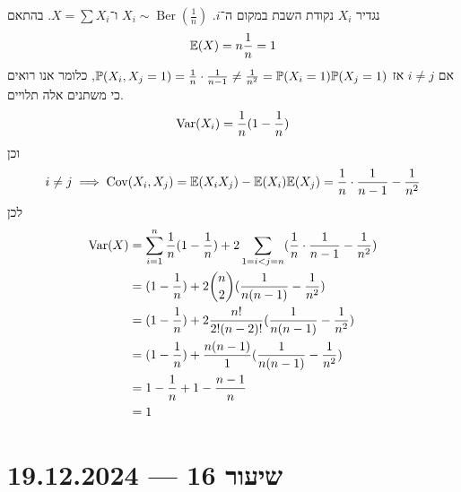 \begin{solution}
	נגדיר $X_i$ נקודת השבת במקום ה־$i$.
	$X_i \sim \operatorname{Ber}(\frac{1}{n})$ ו־$X = \sum X_i$.
	בהתאם
	\[
		\mathbb{E}(X) = n \frac{1}{n} = 1
	\]
	אם $i \ne j$ אז $\mathbb{P}(X_i, X_j = 1) = \frac{1}{n} \cdot \frac{1}{n - 1} \ne \frac{1}{n^2} = \mathbb{P}(X_i = 1) \mathbb{P}(X_j = 1)$, כלומר אנו רואים כי משתנים אלה תלויים.
	\[
		\operatorname{Var}(X_i) = \frac{1}{n} (1 - \frac{1}{n})
	\]
	וכן
	\[
		i \ne j
		\implies \operatorname{Cov}(X_i, X_j)
		= \mathbb{E}(X_i X_j) - \mathbb{E}(X_i) \mathbb{E}(X_j)
		= \frac{1}{n} \cdot \frac{1}{n - 1} - \frac{1}{n^2}
	\]
	לכן
	\begin{align*}
		\operatorname{Var}(X)
		& = \sum_{i = 1}^{n} \frac{1}{n}(1 - \frac{1}{n}) + 2 \sum_{1 = i < j = n} (\frac{1}{n} \cdot \frac{1}{n - 1} - \frac{1}{n^2}) \\
		& = (1 - \frac{1}{n}) + 2 \binom{n}{2} (\frac{1}{n(n - 1)} - \frac{1}{n^2}) \\
		& = (1 - \frac{1}{n}) + 2 \frac{n!}{2! (n - 2)!} (\frac{1}{n(n - 1)} - \frac{1}{n^2}) \\
		& = (1 - \frac{1}{n}) + \frac{n(n - 1)}{1} (\frac{1}{n(n - 1)} - \frac{1}{n^2}) \\
		& = 1 - \frac{1}{n} + 1 - \frac{n - 1}{n} \\
		& = 1
	\end{align*}
\end{solution}

\section{שיעור 16 --- 19.12.2024}
